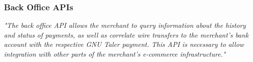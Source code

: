 \subsubsection{Back Office APIs}
\begin{center}
    \textit{
        "The back office API allows the merchant to query information about the history and status of payments, as well as correlate wire transfers to the merchant’s bank account with the respective GNU Taler payment. 
        This API is necessary to allow integration with other parts of the merchant’s e-commerce infrastructure."
    }
\end{center}

    



